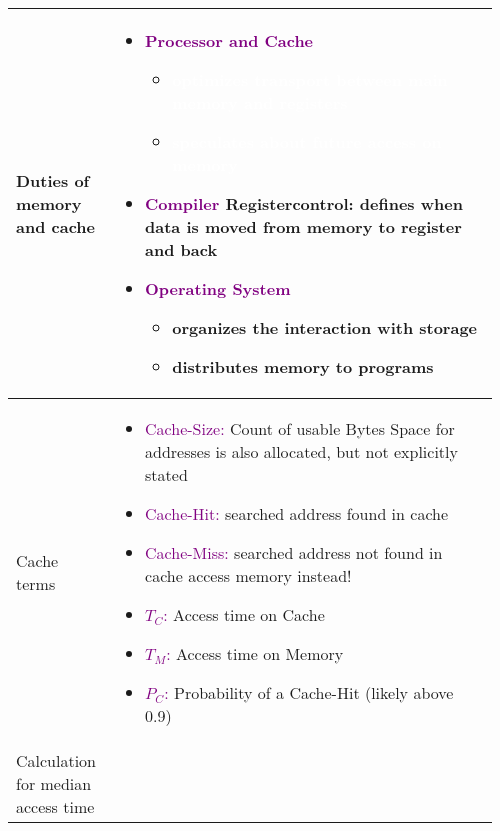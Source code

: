 \documentclass[main.tex,fontsize=8pt,paper=a4,paper=portrait,DIV=calc,]{scrartcl}
\begin{document}
\pagebreak
\begin{table}[ht!]
\begin{tabular}{|m{0.2\linewidth}|m{0.755\linewidth}|}
\hline
Duties of memory and cache & 
\begin{itemize}
\item \textcolor{purple}{Processor and Cache}\newline
  \begin{itemize}
  \item \textcolor{white}{optimizes transport between main memory and registers}
  \item \textcolor{white}{speculates about future access on memory}
  \end{itemize} 
\item \textcolor{purple}{Compiler}\newline
  Registercontrol: defines when data is moved from memory to register and back
\item \textcolor{purple}{Operating System}\newline
  \begin{itemize}
    \item organizes the interaction with storage
    \item distributes memory to programs
    \end{itemize}
\vspace{-3mm}
\end{itemize}\\ 
\hline
Cache terms & 
\begin{itemize}
\item \textcolor{purple}{Cache-Size:} Count of usable Bytes\newline
  Space for addresses is also allocated, but not explicitly stated
\item \textcolor{purple}{Cache-Hit:} searched address found in cache
\item \textcolor{purple}{Cache-Miss:} searched address not found in cache\newline
  access memory instead!
\item \textcolor{purple}{\(T_C\):} Access time on Cache
\item \textcolor{purple}{\(T_M\):} Access time on Memory
\item \textcolor{purple}{\(P_C\):} Probability of a Cache-Hit (likely above 0.9)
\vspace{-3mm}
\end{itemize} \\
\hline
Calculation for median access time & 

\end{tabular}
\end{table}
\end{document}
